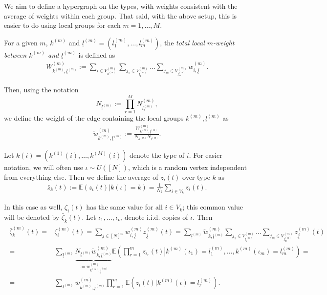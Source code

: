 \documentclass{article}
\newcommand{\E}{\mathbb{E}}
\newcommand{\1}[1]{{\mathds{1}}_{\left\{#1\right\}}}
\newcommand{\rem}[1]{{#1}}
\begin{document}
	We aim to define a hypergraph on the types, with weights consistent with the average of weights within each group. That said, with the above setup, this is easier to do using local groups for each $m=1,\dots,M$.
	
	For a given $m$, $k^{(m)}$ and $\underline{l}^{(m)}=\left(l_1^{(m)}, \dots, l_m^{(m)} \right)$, the \emph{total local $m$-weight between $k^{(m)}$ and $\underline{l}^{(m)}$} is defined as
	\begin{align}
		W_{k^{(m)},\underline{l}^{(m)}}^{(m)}:=\sum_{i \in V_{k^{(m)}}^{(m)}}\sum_{j_1 \in V_{l_1^{(m)}}^{(m)}} \dots \sum_{j_m \in V_{l_m^{(m)}}^{(m)}}w_{i,\underline{j}}^{(m)}.
	\end{align}
	
	Then, using the notation
	$$N_{\underline{l}^{(m)}}:=\prod_{r=1}^{M}N_{l_r^{(m)}}^{(m)},$$
	we define the weight of the edge containing the local groups $k^{(m)}, \underline{l}^{(m)}$ as
	\begin{align}
		\tilde{w}_{k^{(m)},\underline{l}^{(m)}}^{(m)}:=\frac{W_{k^{(m)},\underline{l}^{(m)}}^{(m)}}{N_{k^{(m)}}N_{\underline{l}^{(m)}}}.
	\end{align}
	
	Let $k(i)=\left(k^{(1)}(i), \dots, k^{(M)}(i) \right)$ denote the type of $i$. For easier notation, we will often use $\iota \sim U \left([N] \right)$, which is a random vertex independent from everything else. Then we define the average of $z_i(t)$ over type $k$ as
	\begin{align}
		\label{def:bar_z2}
		\bar{z}_{k}(t):= \E \left(\left.z_{\iota}(t) \right| k(\iota)=k \right)=\frac{1}{N_k}\sum_{i \in V_k}z_{i}(t).	
	\end{align}
	
	In this case as well, $\zeta_i(t)$ has the same value for all $i \in V_k$; this common value will be denoted by $\bar{\zeta}_k(t).$ Let $\iota_1, \dots, \iota_m$ denote i.i.d. copies of $\iota.$ Then
	\begin{align}
		\label{eq:zeta_bar}
		\begin{split}
			\bar{\zeta}_k^{(m)}(t)=& \zeta_i^{(m)}(t)=\sum_{j \in [N]^m}w_{i, \underline{j}}^{(m)}z_{\underline{j}}^{(m)}(t)=\sum_{\underline{l}^{(m)}}\tilde{w}_{k,\underline{l}^{(m)}}^{(m)}\sum_{j_1 \in V_{l_1^{(m)}}^{(m)}} \dots \sum_{j_m \in V_{l_m^{(m)}}^{(m)}}z_{\underline{j}}^{(m)}(t) \\
			=& \sum_{\underline{l}^{(m)}} \underbrace{N_{\underline{l}^{(m)}}\tilde{w}_{k,\underline{l}^{(m)}}^{(m)}}_{:=\bar{w}_{k^{(m)},\underline{j}^{(m)}}^{(m)}} \E \left(\left. \prod_{r=1}^{m}z_{\iota_r}(t) \right| k^{(m)}(\iota_1)=l_1^{(m)}, \dots, k^{(m)}(\iota_{m})=l_m^{(m)} \right)=\\
			=& \sum_{\underline{l}^{(m)}} \bar{w}_{k^{(m)},\underline{j}^{(m)}}^{(m)}\prod_{r=1}^{m}\E \left(\left. z_{\iota}(t) \right| k^{(m)}(\iota)=l_r^{(m)} \right)\rem{.}
		\end{split}
	\end{align}
	
\end{document}
